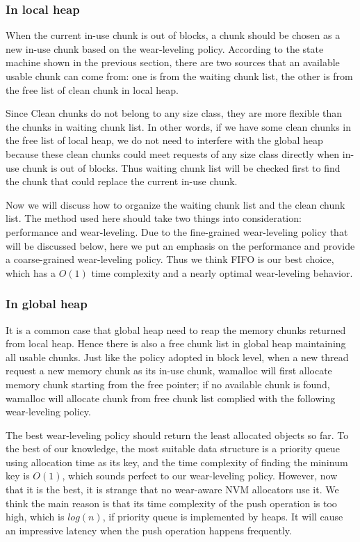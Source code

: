 \documentclass{vldb}
\begin{document}
\subsubsection{In local heap}

When the current in-use chunk is out of blocks, 
a chunk should be chosen as a new in-use chunk based on the wear-leveling policy.
According to the state machine shown in the previous section,
there are two sources that an available usable chunk can come from:
one is from the waiting chunk list, the other is from the free list of clean chunk in local heap.

Since Clean chunks do not belong to any size class, they are more flexible than the chunks in waiting chunk list.
In other words, if we have some clean chunks in the free list of local heap, 
we do not need to interfere with the global heap
because these clean chunks could meet requests of any size class directly when in-use chunk is out of blocks.
Thus waiting chunk list will be checked first to find the chunk that could replace the current in-use chunk.

Now we will discuss how to organize the waiting chunk list and the clean chunk list.
The method used here should take two things into consideration:
performance and wear-leveling.
Due to the fine-grained wear-leveling policy that will be discussed below,
here we put an emphasis on the performance and provide a coarse-grained wear-leveling policy.
Thus we think FIFO is our best choice, which has a $O(1)$ time complexity and a nearly optimal wear-leveling behavior.

\subsubsection{In global heap}
It is a common case that global heap need to reap the memory chunks returned from local heap.
Hence there is also a free chunk list in global heap maintaining all usable chunks. 
Just like the policy adopted in block level, 
when a new thread request a new memory chunk as its in-use chunk,
wamalloc will first allocate memory chunk starting from the free pointer; 
if no available chunk is found, wamalloc will allocate chunk from free chunk list complied with the following wear-leveling policy.

The best wear-leveling policy should return the least allocated objects so far. 
To the best of our knowledge, the most suitable data structure is a priority queue using allocation time as its key,
and the time complexity of finding the mininum key is $O(1)$, which sounds perfect to our wear-leveling policy.
However, now that it is the best, it is strange that no wear-aware NVM allocators use it.
We think the main reason is that its time complexity of the push operation is too high, which is $log(n)$, if priority queue is implemented by heaps. 
It will cause an impressive latency when the push operation happens frequently.
\end{document}
